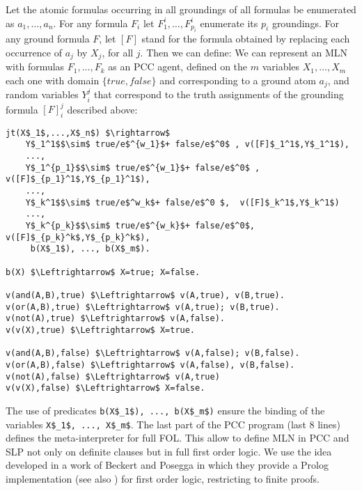 \documentclass[letterpaper]{article}
\theoremstyle{plain}
\theoremstyle{definition}
\theoremstyle{remark}
\theoremstyle{definition}
\begin{document}
Let the atomic formulas occurring in all groundings of all formulas be enumerated as $a_1,\ldots, a_n$. For any formula $F_i$ let $F^i_1, \ldots, F^i_{p_i}$ enumerate its $p_i$ groundings. For any ground formula $F$, let $[F]$ stand for the formula obtained by replacing each occurrence of $a_j$ by $X_j$, for all $j$. Then we can define:
We can represent an MLN with formulas $F_1, \ldots, F_k$ as an PCC agent, defined on the $m$ variables $X_1, \ldots, X_m$ each one with domain $\{ true, false \}$ and corresponding to a ground atom $a_j$, and random variables $Y_i^j$ that correspond to the truth assignments of the grounding formula $[F]_i^j$ described above:
\begin{lstlisting}[mathescape=true]
jt(X$_1$,...,X$_n$) $\rightarrow$ 
	Y$_1^1$$\sim$ true/e$^{w_1}$+ false/e$^0$ , v([F]$_1^1$,Y$_1^1$),
	...,
	Y$_1^{p_1}$$\sim$ true/e$^{w_1}$+ false/e$^0$ , v([F]$_{p_1}^1$,Y$_{p_1}^1$),
	...,
	Y$_k^1$$\sim$ true/e$^w_k$+ false/e$^0 $,  v([F]$_k^1$,Y$_k^1$)
	...,
	Y$_k^{p_k}$$\sim$ true/e$^{w_k}$+ false/e$^0$,  v([F]$_{p_k}^k$,Y$_{p_k}^k$),
	 b(X$_1$), ..., b(X$_m$).
	
b(X) $\Leftrightarrow$ X=true; X=false.

v(and(A,B),true) $\Leftrightarrow$ v(A,true), v(B,true).
v(or(A,B),true) $\Leftrightarrow$ v(A,true); v(B,true).
v(not(A),true) $\Leftrightarrow$ v(A,false).
v(v(X),true) $\Leftrightarrow$ X=true.

v(and(A,B),false) $\Leftrightarrow$ v(A,false); v(B,false).
v(or(A,B),false) $\Leftrightarrow$ v(A,false), v(B,false).
v(not(A),false) $\Leftrightarrow$ v(A,true)
v(v(X),false) $\Leftrightarrow$ X=false.
\end{lstlisting}
The use of predicates \lstinline[mathescape=true]{b(X$_1$), ..., b(X$_m$)} ensure the binding of the variables \lstinline[mathescape=true]{X$_1$, ..., X$_m$}.
The last part of the PCC program (last 8 lines) defines the meta-interpreter for full FOL. This allow to define MLN in  PCC and SLP not only on definite clauses but in full first order logic. We use the idea developed in a work of Beckert and Posegga \cite{lean-TAP} in which they provide a Prolog implementation (see also \cite{lean-TAP-website}) for first order logic, restricting to finite proofs.
\end{document}
